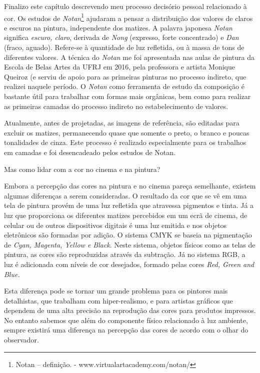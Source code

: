 Finalizo este capítulo descrevendo meu processo decisório pessoal
relacionado à cor. Os estudos de \emph{Notan}\footnote{Notan --
	definição. - www.virtualartacademy.com/notan/} ajudaram a pensar a
distribuição dos valores de claros e escuros na pintura, independente
dos matizes. A palavra japonesa \emph{Notan} significa \emph{escuro,
	claro}, derivada de \emph{Nong} (expresso, forte concentrado) e
\emph{Dan} (fraco, aguado). Refere-se à quantidade de luz refletida, ou
à massa de tons de diferentes valores. A técnica do \emph{Notan} me foi
apresentada nas aulas de pintura da Escola de Belas Artes da UFRJ em
2016, pela professora e artista Monique Queiroz (e serviu de apoio para
as primeiras pinturas no processo indireto, que realizei naquele
período. O \emph{Notan} como ferramenta de estudo da composição é
bastante útil para trabalhar com formas mais orgânicas, bem como para
realizar as primeiras camadas do processo indireto no estabelecimento
de valores.

Atualmente, antes de projetadas, as imagens de referência, são editadas
para excluir os matizes, permanecendo quase que somente o preto, o
branco e poucas tonalidades de cinza. Este processo é realizado
especialmente para os trabalhos em camadas e foi desencadeado pelos
estudos de Notan.

Mas como lidar com a cor no cinema e na pintura?

Embora a percepção das cores na pintura e no cinema pareça semelhante,
existem algumas diferenças a serem consideradas. O resultado da cor que
se vê em uma tela de pintura provém de uma luz refletida que atravessa
pigmentos e tinta. Já a luz que proporciona os diferentes matizes
percebidos em um ecrã de cinema, de celular ou de outros dispositivos
digitais é uma luz emitida e nos objetos eletrônicos são formadas por
adição. O sistema CMYK se baseia na pigmentação de \emph{Cyan, Magenta,
	Yellow e Black}. Neste sistema, objetos físicos como as telas de
pintura, as cores são reproduzidas através da subtração. Já no sistema
RGB, a luz é adicionada com níveis de cor desejados, formado pelas
cores \emph{Red, Green and Blue.}

Esta diferença pode se tornar um grande problema para os pintores mais
detalhistas, que trabalham com hiper-realismo, e para artistas gráficos
que dependem de uma alta precisão na reprodução das cores para produtos
impressos. No entanto sabemos que além do componente físico relacionado
à luz ambiente, sempre existirá uma diferença na percepção das cores de
acordo com o olhar do observador.

